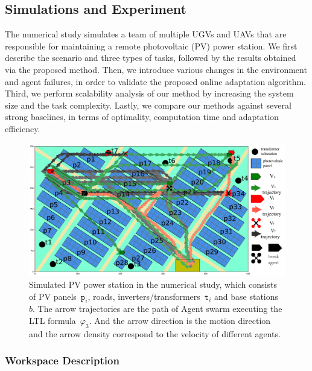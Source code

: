 \subsection{Simulations and Experiment}\label{subsec:simulation}


The numerical study simulates a team of multiple UGVs and UAVs
that are responsible for maintaining a remote photovoltaic (PV) power station.
We first describe the scenario and three types of tasks,
followed by the results obtained via the proposed method.
Then, we introduce various changes in the environment and agent failures,
in order to validate the proposed online adaptation algorithm.
Third, we perform scalability analysis of our method by increasing
the system size and the task complexity.
Lastly, we compare our methods against several strong baselines, in terms of
optimality, computation time and adaptation efficiency.


\begin{figure}
\includegraphics[scale=0.18]{figures/background3.pdf}
\caption{Simulated PV power station in the numerical study,
  which consists of PV panels~$\texttt{p}_i$, roads,
  inverters/transformers~$\texttt{t}_i$ and base stations~$b$.
  The arrow trajectories are the path of Agent swarm
  executing the LTL formula~$\varphi_{3}$. And the arrow direction
  is the motion direction and the arrow density correspond to the velocity of different agents.}
\label{fig:workspace}
\end{figure}

\subsubsection{Workspace Description}\label{subsubsec:ws}

